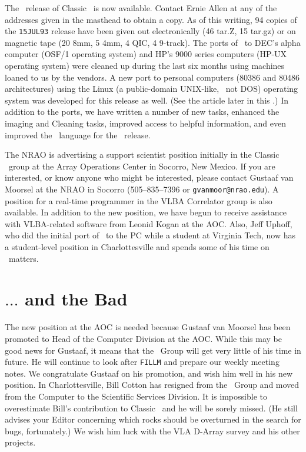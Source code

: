 The \RELEASENAME\ release of Classic \AIPS\ is now available.  Contact
Ernie Allen at any of the addresses given in the masthead to obtain a
copy.  As of this writing, 94 copies of the {\tt 15JUL93} release
have been given out electronically (46 tar.Z, 15 tar.gz) or on
magnetic tape (20 8mm, 5 4mm, 4 QIC, 4 9-track).  The ports of \AIPS\
to DEC's alpha computer (OSF/1 operating system) and HP's 9000 series
computers (HP-UX operating system) were cleaned up during the last six
months using machines loaned to us by the vendors.  A new port to
personal computers (80386 and 80486 architectures) using the Linux (a
public-domain UNIX-like, \ie\ not DOS) operating system was developed
for this release as well.  (See the article later in this
\AIPSLETTER.)  In addition to the ports, we have written a number of
new tasks, enhanced the imaging and Cleaning tasks, improved access to
helpful information, and even improved the \POPS\ language for the
\RELEASENAME\ release.

The NRAO is advertising a support scientist position initially in the
Classic \AIPS\ group at the Array Operations Center in Socorro, New
Mexico.  If you are interested, or know anyone who might be
interested, please contact Gustaaf van Moorsel at the NRAO in Socorro
(505--835--7396 or {\tt gvanmoor@nrao.edu}).  A position for a
real-time programmer in the VLBA Correlator group is also available.
In addition to the new position, we have begun to receive assistance
with VLBA-related software from Leonid Kogan at the \hbox{AOC}.  Also,
Jeff Uphoff, who did the initial port of \AIPS\ to the PC while a
student at Virginia Tech, now has a student-level position in
Charlottesville and spends some of his time on \AIPS\ matters.

\section{$\ldots$ and the Bad}

The new position at the AOC is needed because Gustaaf van Moorsel has
been promoted to Head of the Computer Division at the \hbox{AOC}.
While this may be good news for Gustaaf, it means that the \AIPS\
Group will get very little of his time in future.  He will continue to
look after {\tt FILLM} and prepare our weekly meeting notes.
We congratulate Gustaaf on his promotion, and wish him well in his new
position.  In Charlottesville, Bill Cotton has resigned from the
\AIPS\ Group and moved from the Computer to the Scientific Services
Division.  It is impossible to overestimate Bill's contribution to
Classic \AIPS\ and he will be sorely missed.  (He still advises your
Editor concerning which rocks should be overturned in the search for
bugs, fortunately.)  We wish him luck with the VLA D-Array survey and
his other projects.

